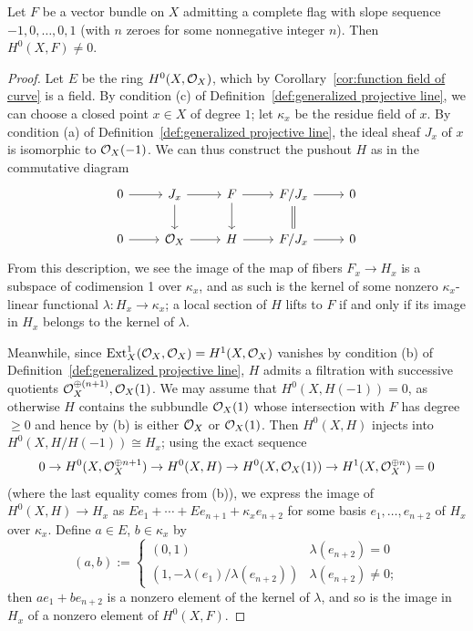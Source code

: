 \begin{lemma} \label{L:section from complete flag}
Let $F$ be a vector bundle on $X$ admitting a complete flag with slope sequence
$-1,0,\dots,0,1$ (with $n$ zeroes for some nonnegative integer $n$).
Then $H^0(X, F) \neq 0$.
\end{lemma}
\begin{proof}
Let $E$ be the ring $H^0(X, \mathcal{O}_X)$, which by Corollary~\ref{cor:function field of curve} is a field.
By condition (c) of Definition~\ref{def:generalized projective line}, we can choose a closed point $x \in X$ of degree $1$;
let $\kappa_x$ be the residue field of $x$.
By condition (a) of Definition~\ref{def:generalized projective line}, the ideal sheaf $J_x$ of $x$ is isomorphic to $\mathcal{O}_X(-1)$.
We can thus construct the pushout $H$ as in the commutative diagram
\[
\begin{tikzcd}
0 \arrow{r} & J_x \arrow{r} \arrow{d} & F \arrow{r}\arrow{d} & F/J_x \arrow{r} \arrow[d,equal] & 0 \\
0 \arrow{r} & \cO_X \arrow{r} & H \arrow{r} & F/J_x \arrow{r} & 0
\end{tikzcd}
\]
From this description, we see the image of the map of fibers $F_x \to H_x$ is a subspace of codimension 1 over $\kappa_x$, and as such is the kernel of some nonzero $\kappa_x$-linear functional $\lambda\colon H_x \to \kappa_x$; a local section of $H$ lifts to $F$ if and only if its image in $H_x$ belongs to the kernel of $\lambda$.

Meanwhile,  since $\operatorname{Ext}^1_X(\mathcal{O}_X, \mathcal{O}_X) = H^1(X, \mathcal{O}_X)$ vanishes by condition (b) of Definition~\ref{def:generalized projective line}, $H$ admits a filtration with successive quotients $\mathcal{O}_X^{\oplus (n+1)}, \mathcal{O}_X(1)$.
We may assume that $H^0(X, H(-1)) = 0$, as otherwise $H$ contains the subbundle $\mathcal{O}_X(1)$ whose intersection with $F$ has degree $\geq 0$ and hence
by (b) is either $\mathcal{O}_X$ or $\mathcal{O}_X(1)$.
Then $H^0(X, H)$ injects into $H^0(X, H/H(-1)) \cong H_x$; using the exact sequence
\[
0 \to H^0(X, \mathcal{O}_X^{\oplus n+1}) \to H^0(X, H) \to H^0(X, \mathcal{O}_X(1)) \to H^1(X, \mathcal{O}_X^{\oplus n}) = 0
\]
(where the last equality comes from (b)),
we express the image of $H^0(X, H) \to H_x$ 
as $E e_1 + \cdots + E e_{n+1} + \kappa_x e_{n+2}$
for some basis $e_1,\dots,e_{n+2}$ of $H_x$ over $\kappa_x$.
Define $a \in E$, $b \in \kappa_x$ by
\[
(a,b) := \begin{cases} (0, 1) & \lambda(e_{n+2}) = 0 \\ (1, -\lambda(e_1)/\lambda(e_{n+2})) & \lambda(e_{n+2}) \neq 0; \end{cases}
\]
then $ae_1 + be_{n+2}$ is a nonzero element of the kernel of $\lambda$, and so is the image in $H_x$
of a nonzero element of $H^0(X, F)$.
\end{proof}

